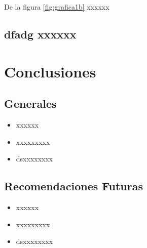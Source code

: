 \documentclass[12pt,a4paper,]{book}
\def\ifdoblecara{} %
\def\ifprincipal{} %
\numberwithin{dummy}{section}
\theoremstyle{ocrenumbox}
\theoremstyle{ocrenumbox}
\theoremstyle{ocrenumbox}
\theoremstyle{ocrenumbox}
\theoremstyle{ocrenum}
\begin{document}
De la figura \ref{fig:grafica1b} xxxxxx

\hypertarget{dfadg-xxxxxx}{%
\section{dfadg xxxxxx}\label{dfadg-xxxxxx}}

\FloatBarrier

\ifdefined\ifprincipal
\else
\setlength{\parindent}{1em}
\pagestyle{fancy}
\setcounter{tocdepth}{4}
\tableofcontents

\fi

\ifdefined\ifdoblecara
\fancyhead{}{}
\fancyhead[LE,RO]{\scriptsize\rightmark}
\fancyfoot[LO,RE]{\scriptsize\slshape \leftmark}
\fancyfoot[C]{}
\fancyfoot[LE,RO]{\footnotesize\thepage}
\else
\fancyhead{}{}
\fancyhead[RO]{\scriptsize\rightmark}
\fancyfoot[LO]{\scriptsize\slshape \leftmark}
\fancyfoot[C]{}
\fancyfoot[RO]{\footnotesize\thepage}
\fi

\renewcommand{\headrulewidth}{0.4pt}
\renewcommand{\footrulewidth}{0.4pt}

\hypertarget{conclusiones}{%
\chapter{Conclusiones}\label{conclusiones}}

\hypertarget{generales}{%
\section{Generales}\label{generales}}

\begin{itemize}
\item
  xxxxxx
\item
  xxxxxxxxx
\item
  dsxxxxxxxx
\end{itemize}

\hypertarget{recomendaciones-futuras}{%
\section{Recomendaciones Futuras}\label{recomendaciones-futuras}}

\begin{itemize}
\item
  xxxxxx
\item
  xxxxxxxxx
\item
  dsxxxxxxxx
\end{itemize}
\end{document}
